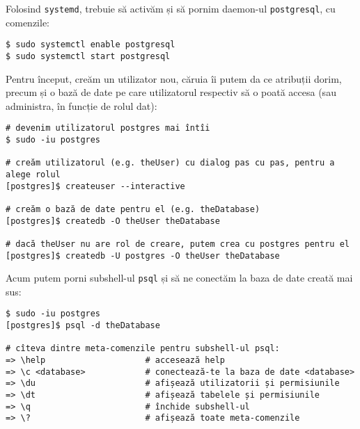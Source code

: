 Folosind \texttt{systemd}, trebuie să activăm și să pornim daemon-ul \texttt{postgresql},
cu comenzile:
{
  \small
\begin{verbatim}
$ sudo systemctl enable postgresql
$ sudo systemctl start postgresql
\end{verbatim}
}

Pentru început, creăm un utilizator nou, căruia îi putem da ce atribuții dorim,
precum și o bază de date pe care utilizatorul respectiv să o poată accesa (sau
administra, în funcție de rolul dat):
{
  \small
\begin{verbatim}
# devenim utilizatorul postgres mai întîi
$ sudo -iu postgres

# creăm utilizatorul (e.g. theUser) cu dialog pas cu pas, pentru a alege rolul
[postgres]$ createuser --interactive

# creăm o bază de date pentru el (e.g. theDatabase)
[postgres]$ createdb -O theUser theDatabase

# dacă theUser nu are rol de creare, putem crea cu postgres pentru el
[postgres]$ createdb -U postgres -O theUser theDatabase
\end{verbatim}
}

Acum putem porni subshell-ul \texttt{psql} și să ne conectăm la baza de date
creată mai sus:
{
  \small
\begin{verbatim}
$ sudo -iu postgres
[postgres]$ psql -d theDatabase

# cîteva dintre meta-comenzile pentru subshell-ul psql:
=> \help                    # accesează help
=> \c <database>            # conectează-te la baza de date <database>
=> \du                      # afișează utilizatorii și permisiunile
=> \dt                      # afișează tabelele și permisiunile
=> \q                       # închide subshell-ul
=> \?                       # afișează toate meta-comenzile
\end{verbatim}
}


